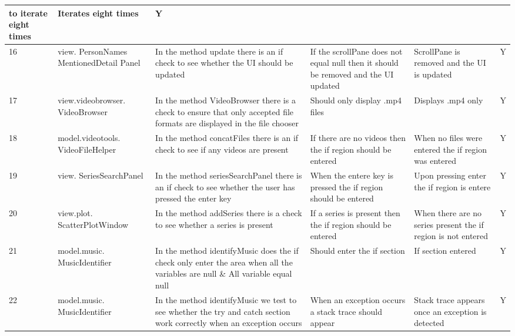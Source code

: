 \begin{center}
\begin{longtable}{| p{18pt} | p{90pt}| p{78pt}| p{75pt} | p{62pt} | p{35pt} |}
to iterate eight times & Iterates eight times & Y\\ \hline
16 & view. \newline PersonNames \newline MentionedDetail \newline Panel & In the method update there is an if check to see whether the UI should be
updated & If the scrollPane does not equal null then it should be removed and the UI updated & ScrollPane is removed and the UI is updated & Y\\ \hline
17 & view.videobrowser. \newline VideoBrowser & In the method VideoBrowser there is a check to ensure that only accepted
file formats are displayed in the file chooser & Should only display .mp4 files & Displays .mp4 only & Y \\ \hline
18 & model.videotools. \newline VideoFileHelper & In the method concatFiles
there is an if check to see if any videos are present & If there are no videos
then the if region should be entered & When no files were entered the if region
was entered & Y\\ \hline
19 & view. \newline SeriesSearchPanel & In the method seriesSearchPanel there is
an if check to see whether the user has pressed the enter key & When the entere
key is pressed the if region should be entered & Upon pressing enter the if
region is entere & Y\\ \hline
20 & view.plot. \newline ScatterPlotWindow & In the method addSeries there is a
check to see whether a series is present & If a series is present then the if
region should be entered & When there are no series present the if region is not
entered & Y\\\hline
21 & model.music. \newline MusicIdentifier & In the method
identifyMusic does the if check only enter the area when all the variables are
null \& All variable equal null & Should enter the if section & If section
entered & Y\\ \hline
22 & model.music. \newline MusicIdentifier & In the method
identifyMusic we test to see whether the try and catch section work correctly
when an exception occurs & When an exception occurs a stack trace should appear
& Stack trace appears once an exception is detected & Y\\ \hline
\end{longtable}
\end{center}

